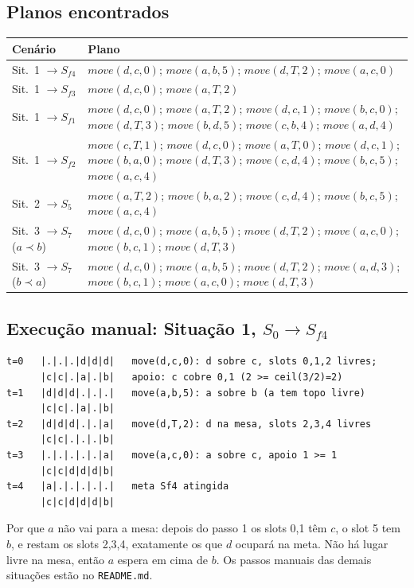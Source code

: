 \documentclass[11pt,a4paper]{article}
\newcommand{\mv}{\mathit{move}}
\begin{document}
\subsection{Planos encontrados}
\begin{center}
\small
\begin{tabular}{lp{10cm}}
\toprule
Cen\'ario & Plano\\
\midrule
Sit.\ 1 $\to S_{f4}$ & $\mv(d,c,0)$; $\mv(a,b,5)$; $\mv(d,T,2)$; $\mv(a,c,0)$\\
Sit.\ 1 $\to S_{f3}$ & $\mv(d,c,0)$; $\mv(a,T,2)$\\
Sit.\ 1 $\to S_{f1}$ & $\mv(d,c,0)$; $\mv(a,T,2)$; $\mv(d,c,1)$; $\mv(b,c,0)$; $\mv(d,T,3)$; $\mv(b,d,5)$; $\mv(c,b,4)$; $\mv(a,d,4)$\\
Sit.\ 1 $\to S_{f2}$ & $\mv(c,T,1)$; $\mv(d,c,0)$; $\mv(a,T,0)$; $\mv(d,c,1)$; $\mv(b,a,0)$; $\mv(d,T,3)$; $\mv(c,d,4)$; $\mv(b,c,5)$; $\mv(a,c,4)$\\
Sit.\ 2 $\to S_5$ & $\mv(a,T,2)$; $\mv(b,a,2)$; $\mv(c,d,4)$; $\mv(b,c,5)$; $\mv(a,c,4)$\\
Sit.\ 3 $\to S_7$ ($a\prec b$) & $\mv(d,c,0)$; $\mv(a,b,5)$; $\mv(d,T,2)$; $\mv(a,c,0)$; $\mv(b,c,1)$; $\mv(d,T,3)$\\
Sit.\ 3 $\to S_7$ ($b\prec a$) & $\mv(d,c,0)$; $\mv(a,b,5)$; $\mv(d,T,2)$; $\mv(a,d,3)$; $\mv(b,c,1)$; $\mv(a,c,0)$; $\mv(d,T,3)$\\
\bottomrule
\end{tabular}
\end{center}

\subsection{Execu\c{c}\~ao manual: Situa\c{c}\~ao 1, $S_0\to S_{f4}$}
\begin{lstlisting}
t=0   |.|.|.|d|d|d|   move(d,c,0): d sobre c, slots 0,1,2 livres;
      |c|c|.|a|.|b|   apoio: c cobre 0,1 (2 >= ceil(3/2)=2)
t=1   |d|d|d|.|.|.|   move(a,b,5): a sobre b (a tem topo livre)
      |c|c|.|a|.|b|
t=2   |d|d|d|.|.|a|   move(d,T,2): d na mesa, slots 2,3,4 livres
      |c|c|.|.|.|b|
t=3   |.|.|.|.|.|a|   move(a,c,0): a sobre c, apoio 1 >= 1
      |c|c|d|d|d|b|
t=4   |a|.|.|.|.|.|   meta Sf4 atingida
      |c|c|d|d|d|b|
\end{lstlisting}
Por que $a$ n\~ao vai para a mesa: depois do passo 1 os slots 0,1 t\^em $c$, o slot 5 tem $b$, e restam os slots 2,3,4, exatamente os que $d$ ocupar\'a na meta. N\~ao h\'a lugar livre na mesa, ent\~ao $a$ espera em cima de $b$. Os passos manuais das demais situa\c{c}\~oes est\~ao no \texttt{README.md}.
\end{document}

